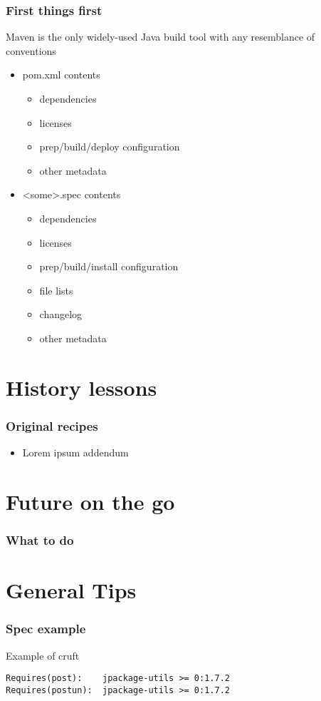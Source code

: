 \documentclass[pdftex,unicode,xcolor=table]{beamer}
\begin{document}
\begin{frame}
  \frametitle{First things first}
Maven is the only widely-used Java build tool with any resemblance of
      conventions
  \begin{itemize}
  \item pom.xml contents
    \begin{itemize}
    \item dependencies
    \item licenses
    \item prep/build/deploy configuration
    \item other metadata
    \end{itemize}
  \item <some>.spec contents
    \begin{itemize}
    \item dependencies
    \item licenses
    \item prep/build/install configuration
    \item file lists
    \item changelog
    \item other metadata
    \end{itemize}
  \end{itemize}
\end{frame}

\section{History lessons}
\begin{frame}
  \frametitle{Original recipes}
  \begin{itemize}
  \item Lorem ipsum addendum
  \end{itemize}
\end{frame}


\section{Future on the go}
\begin{frame}
  \frametitle{What to do}
\end{frame}

\section{General Tips}
\begin{frame}[fragile] %
  \frametitle{Spec example}
  \begin{block}{Example of cruft}
    \scriptsize
\begin{verbatim}
Requires(post):    jpackage-utils >= 0:1.7.2
Requires(postun):  jpackage-utils >= 0:1.7.2
\end{verbatim}
  \end{block}
\end{frame}
\end{document}

